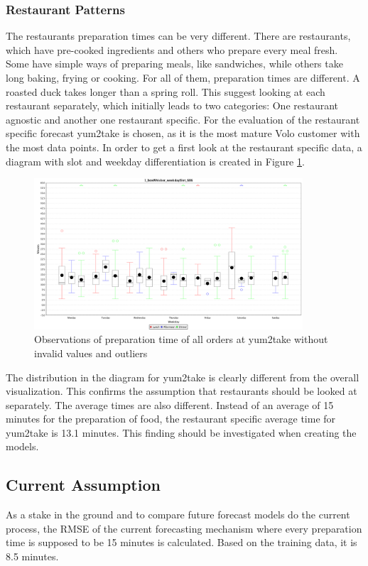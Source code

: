 \subsubsection{Restaurant Patterns}\label{subsection:Restaurant Wise Proceeding}
The restaurants preparation times can be very different. There are restaurants, which have pre-cooked ingredients and others who prepare every meal fresh. Some have simple ways of preparing meals, like sandwiches, while others take long baking, frying or cooking. For all of them, preparation times are different. A roasted duck takes longer than a spring roll.\newline
This suggest looking at each restaurant separately, which initially leads to two categories: One restaurant agnostic and another one restaurant specific. For the evaluation of the restaurant specific forecast yum2take is chosen, as it is the most mature Volo customer with the most data points.\newline
In order to get a first look at the restaurant specific data, a diagram with slot and weekday differentiation is created in Figure \ref{fig:1_boxWhisker_weekdaySlot_686}.
\begin{figure}[h]
\begin{center}
\includegraphics[width=10cm]{images/1_boxWhisker_weekdaySlot_686.png}
\caption{Observations of preparation time of all orders at yum2take without invalid values and outliers}
\label{fig:1_boxWhisker_weekdaySlot_686}
\end{center}
\end{figure}
The distribution in the diagram for yum2take is clearly different from the overall visualization. This confirms the assumption that restaurants should be looked at separately. The average times are also different. Instead of an average of 15 minutes for the preparation of food, the restaurant specific average time for yum2take is 13.1 minutes. This finding should be investigated when creating the models.
\subsection{Current Assumption}
As a stake in the ground and to compare future forecast models do the current process, the RMSE of the current forecasting mechanism where every preparation time is supposed to be 15 minutes is calculated. Based on the training data, it is 8.5 minutes.
